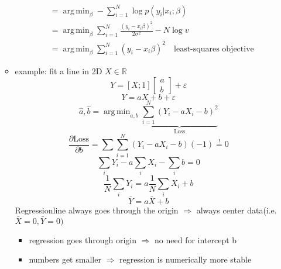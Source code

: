 \documentclass[11pt]{article}
\DeclareMathOperator*{\argmin}{arg\,min}
\begin{document}
\begin{itemize}
\begin{itemize}
\begin{equation*}
\begin{align*}
             \\
            &= \argmin_{\beta} - \sum_{i=1}^N \log p(y_i|x_i; \beta) \\
            &= \argmin_{\beta} \sum_{i=1}^N \frac{(y_i-x_i\beta)^2}{2\sigma^2} -
            N \log v \\
            &= \argmin_{\beta} \sum_{i=1}^N (y_i-x_i\beta)^2 \quad \text{least-squares objective}
          \end{align*}
        \end{equation*}
        \item example: fit a line in 2D $X \in \mathbb{R}$
        \begin{equation*}
          Y = [X;1]
          \left[ \begin{array}{c}
          a \\
          b
          \end{array}\right] + \varepsilon
        \end{equation*}
        \begin{equation*}
          Y = aX + b + \varepsilon
        \end{equation*}
        \begin{equation*}
          \hat{a}, \hat{b} = \argmin_{a,b} \underbrace{\sum_{i=1}^N (Y_i-aX_i-b)^2}_{
          \text{Loss}}
        \end{equation*}
        \begin{equation*}
          \frac{\partial \text{Loss}}{\partial b} = \sum \sum_{i=1}^N (Y_i-aX_i-b)
          (-1)\overset{!}{=}0
        \end{equation*}
        \begin{equation*}
          \sum_iY_i-a\sum_iX_i-\sum_ib=0
        \end{equation*}
        \begin{equation*}
          \frac{1}{N}\sum_iY_i=a\frac{1}{N}\sum_iX_i+b
        \end{equation*}
        \begin{equation*}
          \bar{Y} = a\bar{X}+b
        \end{equation*}
        Regressionline always goes through the origin
        $\Rightarrow$ always center data(i.e. $\bar{X}=0, \bar{Y}=0)$
        \begin{itemize}
          \item regression goes through origin $\Rightarrow$ no need for
          intercept b
          \item numbers get smaller $\Rightarrow$ regression is numerically more stable

\end{itemize}
\end{itemize}
\end{itemize}
\end{document}
